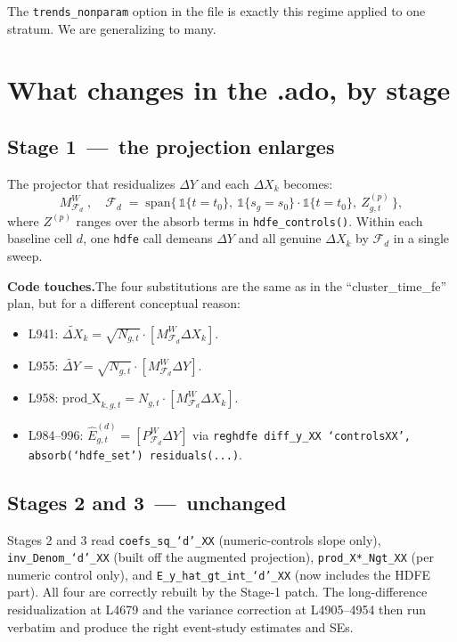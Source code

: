 \documentclass[11pt]{article}
\newcommand{\code}[1]{\texttt{\small #1}}
\newcommand{\1}{\mathbb{1}}
\newcommand{\Pproj}{P^{\!W}}
\newcommand{\Mproj}{M^{\!W}}
\begin{document}
\medskip
\noindent
The \texttt{trends\_nonparam} option in the file is exactly this regime
applied to one stratum. We are generalizing to many.

\section{What changes in the .ado, by stage}

\subsection*{Stage 1 \,---\, the projection enlarges}

The projector that residualizes $\Delta Y$ and each $\Delta X_k$ becomes:
\begin{equation}
\Mproj_{\mathcal{F}_d}
\;,\quad
\mathcal{F}_d \;=\; \mathrm{span}\bigl\{\,\1\{t=t_0\},\ \1\{s_g = s_0\}\cdot \1\{t=t_0\},\ Z^{(p)}_{g,t}\,\bigr\},
\label{eq:Fd}
\end{equation}
where $Z^{(p)}$ ranges over the absorb terms in \code{hdfe\_controls()}.
Within each baseline cell $d$, one \code{hdfe} call demeans $\Delta Y$ and
all genuine $\Delta X_k$ by $\mathcal{F}_d$ in a single sweep.

\medskip\noindent
\textbf{Code touches.}\;The four substitutions are the same as in the
``cluster\_time\_fe'' plan, but for a different conceptual reason:
\begin{itemize}[leftmargin=*, itemsep=0pt]
\item L941: $\widetilde{\Delta X}_k = \sqrt{N_{g,t}}\cdot [\Mproj_{\mathcal{F}_d}\Delta X_k]$.
\item L955: $\widetilde{\Delta Y} = \sqrt{N_{g,t}}\cdot [\Mproj_{\mathcal{F}_d}\Delta Y]$.
\item L958: $\mathrm{prod\_X}_{k,g,t} = N_{g,t}\cdot [\Mproj_{\mathcal{F}_d}\Delta X_k]$.
\item L984--996: $\widehat{E}^{(d)}_{g,t} = [\Pproj_{\mathcal{F}_d}\Delta Y]$
      via \code{reghdfe diff\_y\_XX `controlsXX', absorb(`hdfe\_set') residuals(...)}.
\end{itemize}

\subsection*{Stages 2 and 3 \,---\, unchanged}

\begin{tcolorbox}[colback=codebg, colframe=ok, boxrule=0.6pt, arc=1pt,
                  title=\textcolor{ok}{\textbf{Zero downstream code changes}}]
Stages 2 and 3 read \code{coefs\_sq\_`d'\_XX} (numeric-controls slope only),
\code{inv\_Denom\_`d'\_XX} (built off the augmented projection),
\code{prod\_X*\_Ngt\_XX} (per numeric control only), and
\code{E\_y\_hat\_gt\_int\_`d'\_XX} (now includes the HDFE part). All four are
correctly rebuilt by the Stage-1 patch. The long-difference residualization
at L4679 and the variance correction at L4905--4954 then run verbatim and
produce the right event-study estimates and SEs.
\end{tcolorbox}
\end{document}
